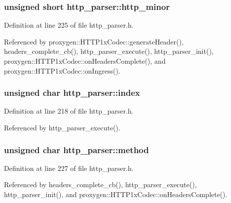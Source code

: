 \subsubsection[{http\+\_\+minor}]{\setlength{\rightskip}{0pt plus 5cm}unsigned short http\+\_\+parser\+::http\+\_\+minor}\label{structhttp__parser_ae8af6433c824f5348773842db62ad4ab}


Definition at line 225 of file http\+\_\+parser.\+h.



Referenced by proxygen\+::\+H\+T\+T\+P1x\+Codec\+::generate\+Header(), headers\+\_\+complete\+\_\+cb(), http\+\_\+parser\+\_\+execute(), http\+\_\+parser\+\_\+init(), proxygen\+::\+H\+T\+T\+P1x\+Codec\+::on\+Headers\+Complete(), and proxygen\+::\+H\+T\+T\+P1x\+Codec\+::on\+Ingress().

\subsubsection[{index}]{\setlength{\rightskip}{0pt plus 5cm}unsigned char http\+\_\+parser\+::index}\label{structhttp__parser_ae1d04bd4da968b103e3ae91c8ee8b834}


Definition at line 218 of file http\+\_\+parser.\+h.



Referenced by http\+\_\+parser\+\_\+execute().

\subsubsection[{method}]{\setlength{\rightskip}{0pt plus 5cm}unsigned char http\+\_\+parser\+::method}\label{structhttp__parser_a28532af3774532c797ce32cbc128accd}


Definition at line 227 of file http\+\_\+parser.\+h.



Referenced by headers\+\_\+complete\+\_\+cb(), http\+\_\+parser\+\_\+execute(), http\+\_\+parser\+\_\+init(), and proxygen\+::\+H\+T\+T\+P1x\+Codec\+::on\+Headers\+Complete().

